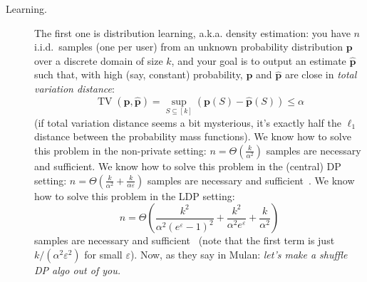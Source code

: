 \documentclass[11pt]{article}
\begin{document}
\begin{description}
\item[Learning.]
The first one is distribution learning, a.k.a. density estimation: you have $n$ i.i.d.\ samples (one per user) from an unknown probability distribution $\mathbf{p}$ over a discrete domain of size $k$, and your goal is to output an estimate $\widehat{\mathbf{p}}$ such that, with high (say, constant) probability, $\mathbf{p}$ and $\widehat{\mathbf{p}}$ are close in \emph{total variation distance}:
\[
		\operatorname{TV}(\mathbf{p},\widehat{\mathbf{p}}) = \sup_{S\subseteq [k]} (\mathbf{p}(S) - \widehat{\mathbf{p}}(S) ) \leq \alpha
\]
(if total variation distance seems a bit mysterious, it's exactly half the $\ell_1$ distance between the probability mass functions). We know how to solve this problem in the non-private setting: $n=\Theta\!\left( \frac{k}{\alpha^2} \right)$ samples are necessary and sufficient. We know how to solve this problem in the (central) DP setting: $n=\Theta\!\left( \frac{k}{\alpha^2} + \frac{k}{\alpha\varepsilon} \right)$ samples are necessary and sufficient~\cite{DiakonikolasHS15}. We know how to solve this problem in the LDP setting: 
\begin{equation}
	\label{eq:learning:ldp}
n=\Theta\!\left(\frac{k^2}{\alpha^2(e^\varepsilon-1)^2}+\frac{k^2}{\alpha^2e^\varepsilon}+\frac{k}{\alpha^2}\right)
\end{equation}
samples are necessary and sufficient~\cite{AcharyaSZ19} (note that the first term is just $k/(\alpha^2\varepsilon^2)$ for small $\varepsilon$). Now, as they say in Mulan: \emph{let's make a shuffle DP algo out of you.}


\end{description}
\end{document}
